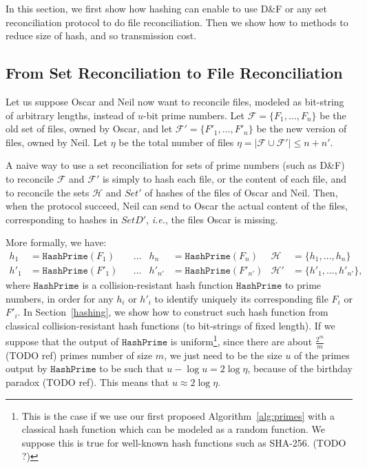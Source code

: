 \documentclass[11pt]{llncs}
\newcommand{\Set}{\mathcal{H}}
\newcommand{\Files}{\mathcal{F}}
\newcommand{\df}{D\&F\xspace}
\newcommand{\ie}{\textit{i.e.}\xspace}
\newcommand{\HashPrime}{\ensuremath{\mathtt{HashPrime}}}
\begin{document}
In this section, we first show how hashing can enable to use \df or any set reconciliation protocol to do file reconciliation.
Then we show how to methods to reduce size of hash, and so transmission cost.

\subsection{From Set Reconciliation to File Reconciliation}

Let us suppose Oscar and Neil now want to reconcile files, modeled as bit-string of arbitrary lengths, instead of $u$-bit prime numbers.
Let $\Files = \{F_1,\dots,F_n\}$ be the old set of files, owned by Oscar, and let $\Files' = \{F'_1,\dots,F'_n\}$ be the new version of files, owned by Neil.
Let $\eta$ be the total number of files $\eta = | \Files \cup \Files'| \le n+n'$.

A naive way to use a set reconciliation for sets of prime numbers (such as \df) to reconcile $\Files$ and $\Files'$ is simply to hash each file, or the content of each file, and to reconcile the sets $\Set$ and $Set'$ of hashes of the files of Oscar and Neil.
Then, when the protocol succeed, Neil can send to Oscar the actual content of the files, corresponding to hashes in $SetD'$, \ie, the files Oscar is missing.

More formally, we have:
\begin{align*}
h_1 &= \HashPrime(F_1) & &\dots & h_n &= \HashPrime(F_n) & \Set &= \{h_1,\dots,h_n\} \\
h'_1 &= \HashPrime(F'_1) & &\dots & h'_{n'} &= \HashPrime(F'_{n'}) & \Set' &= \{h'_1,\dots,h'_{n'}\},
\end{align*}
where $\HashPrime$ is a collision-resistant hash function $\HashPrime$ to prime numbers, in order for any $h_i$ or $h'_i$ to identify uniquely its corresponding file $F_i$ or $F'_i$.
In Section~\ref{hashing}, we show how to construct such hash function from classical collision-resistant hash functions (to bit-strings of fixed length).
If we suppose that the output of $\HashPrime$ is uniform\footnote{This is the case if we use our first proposed Algorithm~\ref{alg:primes} with a classical hash function which can be modeled as a random function.
We suppose this is true for well-known hash functions such as SHA-256. (TODO ?)}, since there are about $\frac{2^m}{m}$ (TODO ref) primes number of size $m$, we just need to be the size $u$ of the primes output by $\HashPrime$ to be such that $u - \log u = 2 \log \eta$, because of the birthday paradox (TODO ref).
This means that $u \approx 2\log \eta$.
\end{document}
